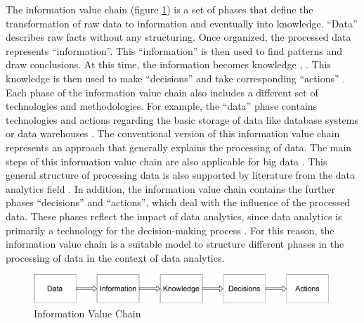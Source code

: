 The information value chain (figure \ref{information_value_chain}) is a set of phases that define the transformation of raw data to information and eventually into knowledge. \enquote{Data} describes raw facts without any structuring. Once organized, the processed data represents \enquote{information}. This \enquote{information} is then used to find patterns and draw conclusions. At this time, the information becomes knowledge \parencite{Fayyad.1996}, \cite{Fayyad.1996b}. This knowledge is then used to make \enquote{decisions} and take corresponding \enquote{actions} \parencite{Sharma.2014}. Each phase of the information value chain also includes a different set of technologies and methodologies. For example, the \enquote{data} phase contains technologies and actions regarding the basic storage of data like database systems or data warehouses \parencite{Abbasi.2016}. The conventional version of this information value chain represents an approach that generally explains the processing of data. The main steps of this information value chain are also applicable for big data \parencite{Abbasi.2016}. This general structure of processing data is also supported by literature from the data analytics field \parencite{Runkler.2020}. In addition, the information value chain contains the further phases \enquote{decisions} and \enquote{actions}, which deal with the influence of the processed data. These phases reflect the impact of data analytics, since data analytics is primarily a technology for the decision-making process \parencite{Runkler.2020}. For this reason, the information value chain is a suitable model to structure different phases in the processing of data in the context of data analytics. %

\begin{figure}[htbp]
    \includegraphics[width=0.99\textwidth, keepaspectratio]{content/02_theretical_foundations/informationValueChain.pdf}
    \caption{Information Value Chain}    
    \label{information_value_chain}
\end{figure}


